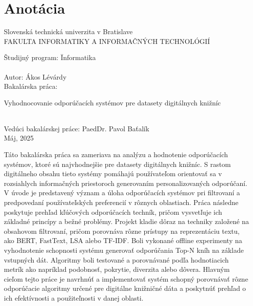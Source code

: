 \documentclass[\myFontSize,a4paper,oneside,hidelinks]{article}
\begin{document}
\section*{Anotácia}
\begin{minipage}[t]{\columnwidth}%
Slovenská technická univerzita v Bratislave\\
%
\textsc{\large FAKULTA INFORMATIKY A INFORMAČNÝCH TECHNOLÓGIÍ}
%
\begin{tabbing}
Študijný program: \hspace{3em} \= Informatika\\\\
%
Autor: \> Ákos Lévárdy \\
Bakalárska práca: \>\parbox[t]{0.6\textwidth}{Vyhodnocovanie odporúčacích systémov pre datasety digitálnych knižníc}\\
Vedúci bakalárskej práce: \> PaedDr. Pavol Baťalík\\
Máj, 2025
\end{tabbing}
\end{minipage}
\bigskip{}

Táto bakalárska práca sa zameriava na analýzu a hodnotenie odporúčacích systémov, ktoré sú najvhodnejšie pre datasety digitálnych knižníc. S rastom digitálneho obsahu tieto systémy pomáhajú používateľom orientovať sa v rozsiahlych informačných priestoroch generovaním personalizovaných odporúčaní. 
V úvode je predstavený význam a úloha odporúčacích systémov pri filtrovaní a predpovedaní používateľských preferencií v rôznych oblastiach. Práca následne poskytuje prehľad kľúčových odporúčacích techník, pričom vysvetľuje ich základné princípy a bežné problémy. Projekt kladie dôraz na techniky založené na obsahovom filtrovaní, pričom porovnáva rôzne prístupy na reprezentáciu textu, ako BERT, FastText, LSA alebo TF-IDF.
Boli vykonané offline experimenty na vyhodnotenie schopnosti systému generovať odporúčania Top-N kníh na základe vstupných dát. Algoritmy boli testované a porovnávané podľa hodnotiacich metrík ako napríklad podobnosť, pokrytie, diverzita alebo dôvera.
Hlavným cieľom tejto práce je navrhnúť a implementovať systém schopný porovnávať rôzne odporúčacie algoritmy určené pre digitálne knižničné dáta a poskytnúť prehľad o ich efektívnosti a použiteľnosti v danej oblasti.




\newpage{} 
\setcounter{page}{9}
\renewcommand{\contentsname}{Table of Contents}
\tableofcontents
\end{document}
